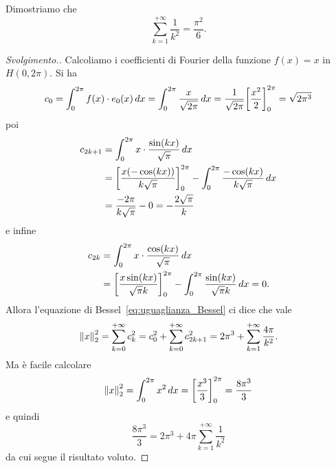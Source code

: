 \begin{exercise}
\label{ex:Basilea}%
Dimostriamo che
\begin{equation}\label{eq:basilea}
  \sum_{k=1}^{+\infty} \frac{1}{k^2} = \frac{\pi^2}{6}.
\end{equation}
\end{exercise}
\begin{proof}[Svolgimento.]
Calcoliamo i coefficienti di Fourier della funzione $f(x)=x$ in $H(0,2\pi)$.
Si ha
\[
 c_0 = \int_0^{2\pi} f(x)\cdot e_0(x)\, dx = \int_0^{2\pi} \frac{x}{\sqrt{2\pi}}\, dx = \frac{1}{\sqrt{2\pi}}{\left[ \frac{x^2}{2} \right]}_0^{2\pi}
  = \sqrt{2\pi^3}
\]
poi
\begin{align*}
  c_{2k+1} &= \int_0^{2\pi} x \cdot \frac{\sin(kx)}{\sqrt \pi}\, dx \\
   &= {\left[ \frac{x(-\cos(kx))}{k\sqrt \pi} \right]}_0^{2\pi}
   - \int_0^{2\pi} \frac{-\cos(kx)}{k\sqrt \pi}\, dx\\
   &= \frac{-2\pi}{k\sqrt \pi} - 0 = -\frac{2\sqrt \pi}{k}
\end{align*}
e infine
\begin{align*}
  c_{2k} &= \int_0^{2\pi} x \cdot \frac{\cos (kx)}{\sqrt \pi}\, dx \\
  &= {\left[ \frac{x \sin(kx)}{\sqrt \pi k} \right]}_0^{2\pi}
  - \int_0^{2\pi} \frac{\sin(kx)}{\sqrt \pi k}\, dx
  = 0.
\end{align*}
Allora l'equazione di Bessel~\eqref{eq:uguaglianza_Bessel} ci dice
che vale
\[
  {\left\Vert x\right\Vert}_2^2 = \sum_{k=0}^{+\infty} c_k^2
  = c_0^2 + \sum_{k=0}^{+\infty} c_{2k+1}^2
  = 2\pi^3 + \sum_{k=1}^{+\infty} \frac{4\pi}{k^2}.
\]
Ma è facile calcolare
\[
 {\left\Vert x\right\Vert}_2^2 = \int_0^{2\pi} x^2\, dx = {\left[ \frac{x^3}{3} \right]}_0^{2\pi}
  = \frac{8\pi^3}{3}
\]
e quindi
\[
  \frac{8\pi^3}{3} = 2\pi^3 + 4\pi \sum_{k=1}^{+\infty}\frac{1}{k^2}
\]
da cui segue il risultato voluto.
\end{proof}

